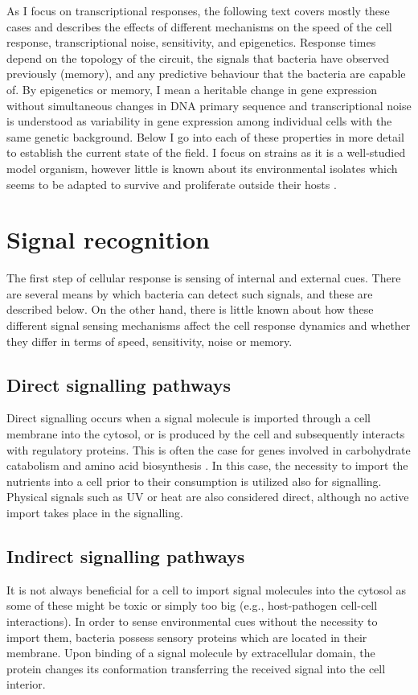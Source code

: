 As I focus on transcriptional responses, the following text covers mostly these cases and describes the effects of different mechanisms on the speed of the cell response, transcriptional noise, sensitivity, and epigenetics.
Response times depend on the topology of the circuit, the signals that bacteria have observed previously (memory), and any predictive behaviour that the bacteria are capable of.
By epigenetics or memory, I mean a heritable change in gene expression without simultaneous changes in DNA primary sequence and transcriptional noise is understood as variability in gene expression among individual cells with the same genetic background.
Below I go into each of these properties in more detail to establish the current state of the field.
I focus on  strains as it is a well-studied model organism, however little is known about its environmental isolates which seems to be adapted to survive and proliferate outside their hosts \cite{byappanahalli2004indigenous, ishii2006presence, somorin2016general}.



\section{Signal recognition}
The first step of cellular response is sensing of internal and external cues.
There are several means by which bacteria can detect such signals, and these are described below.
On the other hand, there is little known about how these different signal sensing mechanisms affect the cell response dynamics and whether they differ in terms of speed, sensitivity, noise or memory.

\subsection{Direct signalling pathways}
Direct signalling occurs when a signal molecule is imported through a cell membrane into the cytosol, or is produced by the cell and subsequently interacts with regulatory proteins.
This is often the case for genes involved in carbohydrate catabolism and amino acid biosynthesis \cite{charlier1992arginine, weickert1992isorepressor, pittard1996various, wheatley2013structural}.
In this case, the necessity to import the nutrients into a cell prior to their consumption is utilized also for signalling.
Physical signals such as UV or heat are also considered direct, although no active import takes place in the signalling.

\subsection{Indirect signalling pathways}
It is not always beneficial for a cell to import signal molecules into the cytosol as some of these might be toxic or simply too big (e.g., host-pathogen cell-cell interactions).
In order to sense environmental cues without the necessity to import them, bacteria possess sensory proteins which are located in their membrane.
Upon binding of a signal molecule by extracellular domain, the protein changes its conformation transferring the received signal into the cell interior.

